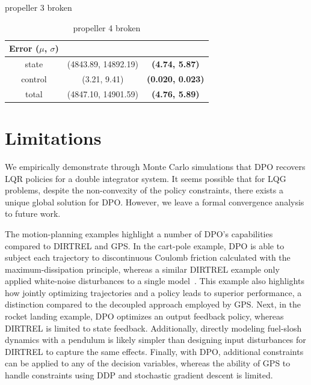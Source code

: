 \begin{table}[H]
\begin{subtable}[t]{0.85\textwidth}
		\caption{propeller 3 broken}
		\vspace{1em}
	\end{subtable}
	\vfill
	\begin{subtable}[t]{0.85\textwidth}
		\centering
		\begin{tabular}{c c c}
			\toprule
			\textbf{Error ($\mu$, $\sigma$)} &
			\specialcellbold{LQR} & 
			\specialcellbold{DPO} \\
			\toprule
			state & (4843.89, 14892.19) & \textbf{(4.74, 5.87)} \\
			control & (3.21, 9.41) & \textbf{(0.020, 0.023)} \\
			total & (4847.10, 14901.59) & \textbf{(4.76, 5.89)}\\
			\toprule
		\end{tabular}
		\caption{propeller 4 broken}
	\end{subtable}
	\label{dpo_quad_prop_results}
\end{table}

\section{Limitations} \label{dpo_limitations}
We empirically demonstrate through Monte Carlo simulations that DPO recovers LQR policies for a double integrator system. It seems possible that for LQG problems, despite the non-convexity of the policy constraints, there exists a unique global solution for DPO. However, we leave a formal convergence analysis to future work.

The motion-planning examples highlight a number of DPO's capabilities compared to DIRTREL and GPS. In the cart-pole example, DPO is able to subject each trajectory to discontinuous Coulomb friction calculated with the maximum-dissipation principle, whereas a similar DIRTREL example only applied white-noise disturbances to a single model~\cite{manchester2019robust}. This example also highlights how jointly optimizing trajectories and a policy leads to superior performance, a distinction compared to the decoupled approach employed by GPS. Next, in the rocket landing example, DPO optimizes an output feedback policy, whereas DIRTREL is limited to state feedback. Additionally, directly modeling fuel-slosh dynamics with a pendulum is likely simpler than designing input disturbances for DIRTREL to capture the same effects. Finally, with DPO, additional constraints can be applied to any of the decision variables, whereas the ability of GPS to handle constraints using DDP and stochastic gradient descent is limited.

